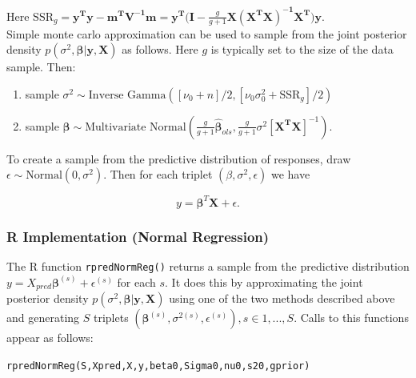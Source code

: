 \documentclass[12pt, a4paper]{article}
\begin{document}
\noindent Here $\text{SSR}_g = \mathbf{y^Ty - m^TV^{-1}m = y^T(I - }\frac{g}{g+1}\mathbf{X(X^TX)^{-1}X^T)y}$.\\

Simple monte carlo approximation can be used to sample from the joint posterior density $p(\sigma^2,\boldsymbol\beta|\mathbf{y,X})$ as follows.  Here $g$ is typically set to the size of the data sample. Then:

\begin{enumerate}
    \item sample $\sigma^2 \sim \text{Inverse Gamma}([\nu_0 + n]/2,[\nu_0\sigma^2_0 + \text{SSR}_g]/2)$
    \item sample $\boldsymbol\beta \sim \text{Multivariate Normal}\left(\frac{g}{g+1}\hat{\boldsymbol\beta}_{ols},\frac{g}{g+1}\sigma^2[\mathbf{X^TX}]^{-1}\right)$.
\end{enumerate}

\noindent To create a sample from the predictive distribution of responses, draw $\epsilon \sim \text{Normal}(0,\sigma^2)$.  Then for each triplet $(\beta,\sigma^2,\epsilon)$ we have

$$y = \boldsymbol\beta^T\mathbf{X} + \epsilon.$$

  \subsubsection{R Implementation (Normal Regression)}

%

The R function \texttt{rpredNormReg()} returns a sample from the predictive distribution $y = X_{pred}\boldsymbol\beta^{(s)} + \epsilon^{(s)}$ for each $s$.  It does this by approximating the joint posterior density $p(\sigma^2,\boldsymbol\beta|\mathbf{y,X})$ using one of the two methods described above and generating $S$ triplets $(\boldsymbol\beta^{(s)}, \sigma^{2(s)},\epsilon^{(s)}), s \in 1,...,S$.  Calls to this functions appear as follows:

\begin{center}
  \texttt{rpredNormReg(S,Xpred,X,y,beta0,Sigma0,nu0,s20,gprior)}\\
\end{center}
\end{document}
